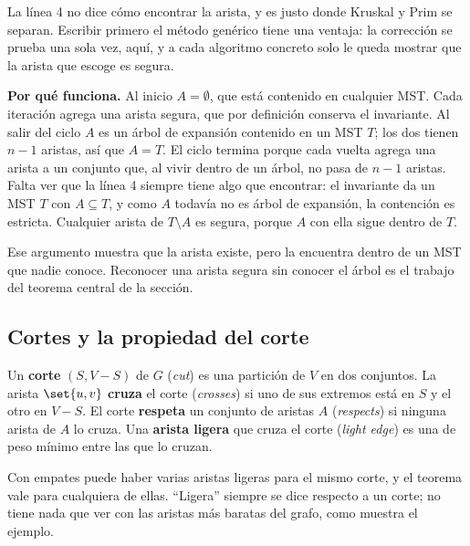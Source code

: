 \documentclass[11pt,letterpaper]{article}
\begin{document}
La línea 4 no dice cómo encontrar la arista, y es justo donde Kruskal
y Prim se separan. Escribir primero el método genérico tiene una
ventaja: la corrección se prueba una sola vez, aquí, y a cada
algoritmo concreto solo le queda mostrar que la arista que escoge es
segura.

\textbf{Por qué funciona.} Al inicio $A = \emptyset$, que está
contenido en cualquier MST. Cada iteración agrega una arista segura,
que por definición conserva el invariante. Al salir del ciclo $A$ es
un árbol de expansión contenido en un MST $T$; los dos tienen $n - 1$
aristas, así que $A = T$. El ciclo termina porque cada vuelta agrega
una arista a un conjunto que, al vivir dentro de un árbol, no pasa de
$n - 1$ aristas. Falta ver que la línea 4 siempre tiene algo que
encontrar: el invariante da un MST $T$ con $A \subseteq T$, y como $A$
todavía no es árbol de expansión, la contención es estricta. Cualquier
arista de $T \setminus A$ es segura, porque $A$ con ella sigue dentro
de $T$.

Ese argumento muestra que la arista existe, pero la encuentra dentro
de un MST que nadie conoce. Reconocer una arista segura sin conocer el
árbol es el trabajo del teorema central de la sección.


\subsection*{Cortes y la propiedad del corte}

\begin{definicion}
  \label{def:corte-mst}
  Un \textbf{corte} $(S, V - S)$ de $G$ (\textit{cut}) es una partición
  de $V$ en dos conjuntos. La arista $\set{u, v}$ \textbf{cruza} el
  corte (\textit{crosses}) si uno de sus extremos está en $S$ y el otro
  en $V - S$. El corte \textbf{respeta} un conjunto de aristas $A$
  (\textit{respects}) si ninguna arista de $A$ lo cruza. Una
  \textbf{arista ligera} que cruza el corte (\textit{light edge}) es
  una de peso mínimo entre las que lo cruzan.
\end{definicion}

Con empates puede haber varias aristas ligeras para el mismo corte, y
el teorema vale para cualquiera de ellas. ``Ligera'' siempre se dice
respecto a un corte; no tiene nada que ver con las aristas más baratas
del grafo, como muestra el ejemplo.
\end{document}
